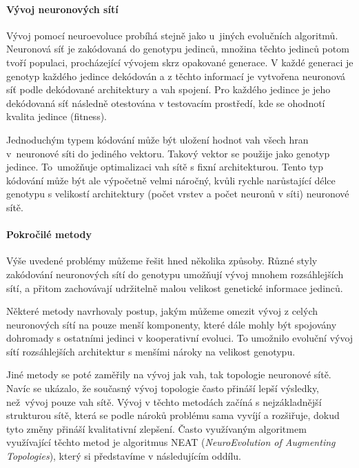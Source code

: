 \paragraph{Vývoj neuronových sítí}
Vývoj pomocí neuroevoluce probíhá stejně jako u~jiných evolučních algoritmů.
Neuronová síť je zakódovaná do genotypu jedinců, množina těchto jedinců potom
tvoří populaci, procházející vývojem skrz opakované generace. V každé generaci
je genotyp každého jedince dekódován a z těchto informací je vytvořena
neuronová síť podle dekódované architektury a vah spojení. Pro každého jedince
je jeho dekódovaná síť následně otestována v testovacím prostředí, kde se
ohodnotí kvalita jedince (fitness).

Jednoduchým typem kódování může být uložení hodnot vah všech hran v~neuronové
síti do jediného vektoru. Takový vektor se použije jako genotyp jedince.
To~umožňuje optimalizaci vah sítě s fixní architekturou. Tento typ kódování
může být ale výpočetně velmi náročný, kvůli rychle narůstající délce genotypu s
velikostí architektury (počet vrstev a počet neuronů v síti) neuronové sítě.

\paragraph{Pokročilé metody}
Výše uvedené problémy můžeme řešit hned několika způsoby. Různé styly
zakódování neuronových sítí do genotypu umožňují vývoj mnohem
rozsáhlejších sítí, a přitom zachovávají udržitelně malou velikost genetické
informace jedinců. 

Některé metody \citet{gomez2008accelerated} navrhovaly postup, jakým můžeme
omezit vývoj z celých neuronových sítí na pouze menší komponenty, které dále
mohly být spojovány dohromady s ostatními jedinci v kooperativní evoluci. To
umožnilo evoluční vývoj sítí rozsáhlejších architektur s menšími nároky na
velikost genotypu.

Jiné metody se poté zaměřily na vývoj jak vah, tak topologie neuronové sítě.
Navíc se ukázalo, že současný vývoj topologie často přináší lepší výsledky,
než~vývoj pouze vah sítě. Vývoj v těchto metodách začíná s nejzákladnější
strukturou sítě, která se podle nároků problému sama vyvíjí a rozšiřuje, dokud
tyto změny přináší kvalitativní zlepšení. Často využívaným algoritmem
využívající těchto metod je algoritmus NEAT (\emph{NeuroEvolution of Augmenting
Topologies}), který si představíme v následujícím oddílu.

